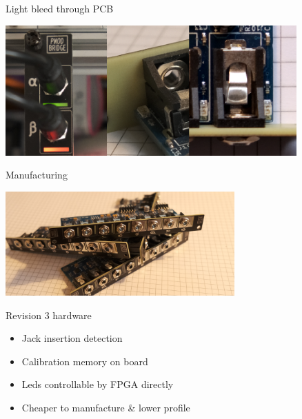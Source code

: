\documentclass{beamer}
\begin{document}
\begin{frame}{Light bleed through PCB}


    \begin{center}
        \includegraphics[height=5cm]{img/led_guide.png}
    \end{center}

\end{frame}

\begin{frame}{Manufacturing}

    \begin{center}
        \includegraphics[height=4cm]{img/mfg_stack.png}
    \end{center}

    \begin{block}{Revision 3 hardware}
        \begin{itemize}
            \item Jack insertion detection
            \item Calibration memory on board
            \item Leds controllable by FPGA directly
            \item Cheaper to manufacture \& lower profile
        \end{itemize}
    \end{block}

\end{frame}
\end{document}
